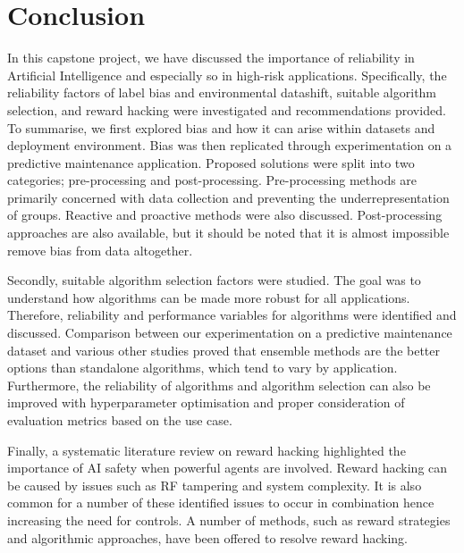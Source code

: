 \chapter{Conclusion}
In this capstone project, we have discussed the importance of reliability in Artificial Intelligence 
and especially so in high-risk applications.
Specifically, the reliability factors of label bias and environmental datashift, suitable algorithm selection,
and reward hacking were investigated and recommendations provided.
To summarise, we first explored bias and how it can arise within datasets and deployment environment.
Bias was then replicated through experimentation on a predictive maintenance application. 
Proposed solutions were split into two categories; pre-processing and post-processing.
Pre-processing methods are primarily concerned with data collection and preventing the underrepresentation of groups.
Reactive and proactive methods were also discussed.
Post-processing approaches are also available, but it should be noted that it is almost impossible remove bias from data altogether.

Secondly, suitable algorithm selection factors were studied. The goal was to understand how algorithms can be made more
robust for all applications. Therefore, reliability and performance variables for algorithms were identified and discussed.
Comparison between our experimentation on a predictive maintenance dataset and various other studies proved that ensemble methods 
are the better options than standalone algorithms, which tend to vary by application. 
Furthermore, the reliability of algorithms and algorithm selection can also be improved with hyperparameter optimisation and proper consideration of 
evaluation metrics based on the use case.

Finally, a systematic literature review on reward hacking highlighted the importance of AI safety when powerful agents
are involved. Reward hacking can be caused by issues such as RF tampering and system complexity. 
It is also common for a number of these identified issues to occur in combination hence increasing the need for controls.
A number of methods, such as reward strategies and algorithmic approaches, have been offered to resolve reward hacking.